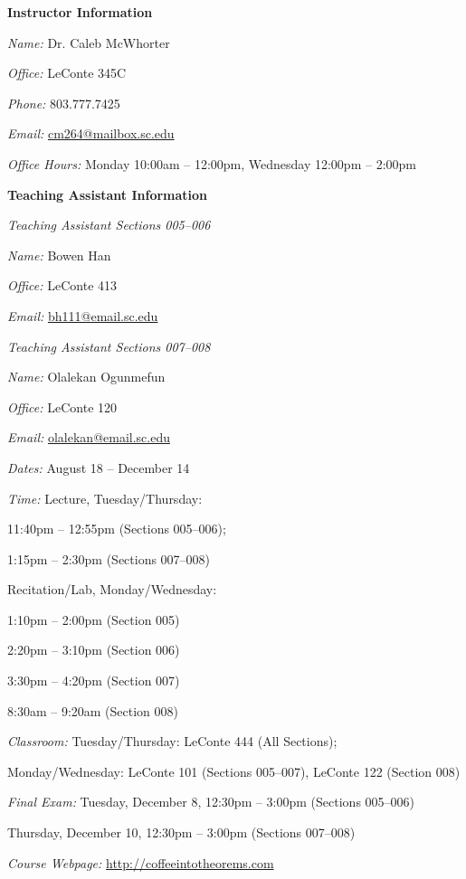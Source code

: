 \documentclass[11pt,letterpaper]{article}
\makeatletter
\newcommand{\classdates}{August 18 -- December 14}
\newcommand{\classtimes}{Lecture, Tuesday/Thursday: \par \hspace{1.5cm} 11:40pm -- 12:55pm (Sections 005--006); \par \hspace{1.5cm} 1:15pm -- 2:30pm (Sections 007--008) \par \hspace{0.95cm} Recitation/Lab, Monday/Wednesday: \par \hspace{1.5cm} 1:10pm -- 2:00pm (Section 005) \par \hspace{1.5cm} 2:20pm -- 3:10pm (Section 006) \par \hspace{1.5cm} 3:30pm -- 4:20pm (Section 007) \par \hspace{1.5cm} 8:30am -- 9:20am (Section 008)}
\newcommand{\classroom}{Tuesday/Thursday: LeConte 444 (All Sections); \par\hspace{1.8cm} Monday/Wednesday: LeConte 101 (Sections 005--007), LeConte 122 (Section 008)}
\newcommand{\instructor}{Dr. Caleb McWhorter}
\newcommand{\office}{LeConte 345C}
\newcommand{\phone}{803.777.7425}
\newcommand{\email}{cm264@mailbox.sc.edu}
\newcommand{\website}{http://coffeeintotheorems.com}
\newcommand{\officehours}{Monday 10:00am -- 12:00pm, Wednesday 12:00pm -- 2:00pm}
\makeatother
\begin{document}
{\bfseries\color{scred} Instructor Information} \par
\textit{Name:} \instructor \par
\textit{Office:} \office \par
\textit{Phone:} \phone \par
\textit{Email:} \href{mailto:\email}{\email} \par
\textit{Office Hours:} \officehours \pvspace{0.3cm}

{\bfseries\color{scred} Teaching Assistant Information} \par \vspace{0.1cm}
\hspace{0.25cm} \begin{minipage}[b]{0.4\textwidth}
        {\itshape Teaching Assistant Sections 005--006} \par
        \textit{Name:} Bowen Han \par
        \textit{Office:} LeConte 413 \par
        \textit{Email:} \href{mailto:bh111@email.sc.edu}{bh111@email.sc.edu}
\end{minipage}\begin{minipage}[b]{0.4\textwidth}
        {\itshape Teaching Assistant Sections 007--008} \par
        \textit{Name:} Olalekan Ogunmefun \par
        \textit{Office:} LeConte 120 \par
        \textit{Email:} \href{mailto:olalekan@email.sc.edu}{olalekan@email.sc.edu}
\end{minipage}
\pspace



\textit{Dates:} \classdates \par\vspace{0.1cm}
\textit{Time:} \classtimes \par\vspace{0.1cm}
\textit{Classroom:} \classroom \par\vspace{0.1cm}
\textit{Final Exam:} Tuesday, December 8, 12:30pm -- 3:00pm (Sections 005--006) \par\hspace{2.0cm} Thursday, December 10, 12:30pm -- 3:00pm (Sections 007--008) \par\vspace{0.1cm}
\textit{Course Webpage:} \href{\website}{\website}
\sectionbreak
\end{document}
